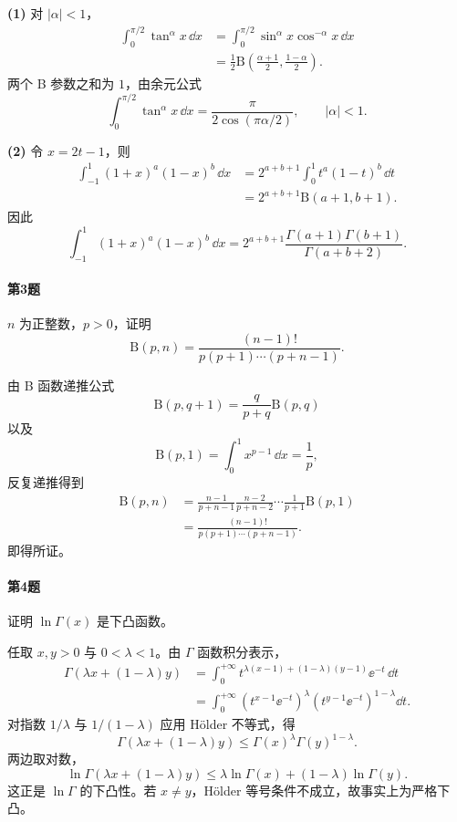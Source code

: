 \begin{xsolution}
\textbf{(1)} 对 $|\alpha|<1$，
\[
\begin{aligned}
\int_0^{\pi/2}\tan^\alpha x\,\dd x
&=\int_0^{\pi/2}\sin^\alpha x\cos^{-\alpha}x\,\dd x\\
&=\frac12\mathrm{B}\left(\frac{\alpha+1}{2},\frac{1-\alpha}{2}\right).
\end{aligned}
\]
两个 B 参数之和为 $1$，由余元公式
\[
\boxed{
\int_0^{\pi/2}\tan^\alpha x\,\dd x
=\frac\pi{2\cos(\pi\alpha/2)},
\qquad |\alpha|<1.}
\]

\textbf{(2)} 令 $x=2t-1$，则
\[
\begin{aligned}
\int_{-1}^1(1+x)^a(1-x)^b\,\dd x
&=2^{a+b+1}\int_0^1t^a(1-t)^b\,\dd t\\
&=2^{a+b+1}\mathrm{B}(a+1,b+1).
\end{aligned}
\]
因此
\[
\boxed{
\int_{-1}^1(1+x)^a(1-x)^b\,\dd x
=2^{a+b+1}\frac{\Gamma(a+1)\Gamma(b+1)}{\Gamma(a+b+2)}.}
\]
\end{xsolution}

\paragraph{第3题}
$n$ 为正整数，$p>0$，证明
\[
\mathrm{B}(p,n)=\frac{(n-1)!}{p(p+1)\cdots(p+n-1)}.
\]

\begin{xsolution}
由 B 函数递推公式
\[
\mathrm{B}(p,q+1)=\frac q{p+q}\mathrm{B}(p,q)
\]
以及
\[
\mathrm{B}(p,1)=\int_0^1x^{p-1}\,\dd x=\frac1p,
\]
反复递推得到
\[
\begin{aligned}
\mathrm{B}(p,n)
&=\frac{n-1}{p+n-1}\frac{n-2}{p+n-2}\cdots
\frac1{p+1}\mathrm{B}(p,1)\\
&=\frac{(n-1)!}{p(p+1)\cdots(p+n-1)}.
\end{aligned}
\]
即得所证。
\end{xsolution}

\paragraph{第4题}
证明 $\ln\Gamma(x)$ 是下凸函数。

\begin{xsolution}
任取 $x,y>0$ 与 $0<\lambda<1$。由 $\Gamma$ 函数积分表示，
\[
\begin{aligned}
\Gamma(\lambda x+(1-\lambda)y)
&=\int_0^{+\infty}
t^{\lambda(x-1)+(1-\lambda)(y-1)}\ee^{-t}\,\dd t\\
&=\int_0^{+\infty}
\left(t^{x-1}\ee^{-t}\right)^\lambda
\left(t^{y-1}\ee^{-t}\right)^{1-\lambda}\dd t.
\end{aligned}
\]
对指数 $1/\lambda$ 与 $1/(1-\lambda)$ 应用 Hölder 不等式，得
\[
\Gamma(\lambda x+(1-\lambda)y)
\leqslant \Gamma(x)^\lambda\Gamma(y)^{1-\lambda}.
\]
两边取对数，
\[
\ln\Gamma(\lambda x+(1-\lambda)y)
\leqslant\lambda\ln\Gamma(x)+(1-\lambda)\ln\Gamma(y).
\]
这正是 $\ln\Gamma$ 的下凸性。若 $x\neq y$，Hölder 等号条件不成立，故事实上为严格下凸。
\end{xsolution}


